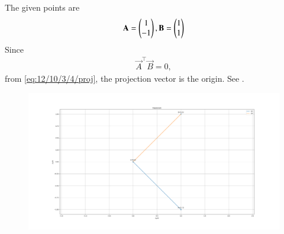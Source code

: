 The given points are
\begin{align}
 \mathbf{A}=\begin{pmatrix}1\\ -1\end{pmatrix},
 \mathbf{B}=\begin{pmatrix}1\\ 1\end{pmatrix}
\end{align}
Since
\begin{align}
	\vec{A}^\top \vec{B} =0,
\end{align}
	from \eqref{eq:12/10/3/4/proj},
the projection vector is the origin.
		See .
\begin{figure}[h]
	\centering
\includegraphics[width=\columnwidth]{chapters/12/10/3/3/figs/vector.png}
\caption{}
		\label{fig:12/10/3/3fig}
\end{figure}
